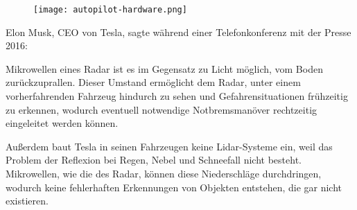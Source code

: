 \begin{figure}\centering
  \texttt{[image: autopilot-hardware.png]}
  \label{autopilot-hardware}
\end{figure}

\noindent Elon Musk, CEO von Tesla, sagte während einer Telefonkonferenz mit der Presse 2016: 

Mikrowellen eines \acs{Radar} ist es im Gegensatz zu Licht möglich, vom Boden zurückzuprallen. Dieser Umstand ermöglicht dem \acs{Radar}, unter einem vorherfahrenden Fahrzeug hindurch zu sehen und Gefahrensituationen frühzeitig zu erkennen, wodurch eventuell notwendige Notbremsmanöver rechtzeitig eingeleitet werden können. 

Außerdem baut Tesla in seinen Fahrzeugen keine \acs{Lidar}-Systeme ein, weil das Problem der Reflexion bei Regen, Nebel und Schneefall nicht besteht. Mikrowellen, wie die des \acs{Radar}, können diese Niederschläge durchdringen, wodurch keine fehlerhaften Erkennungen von Objekten entstehen, die gar nicht existieren. 
